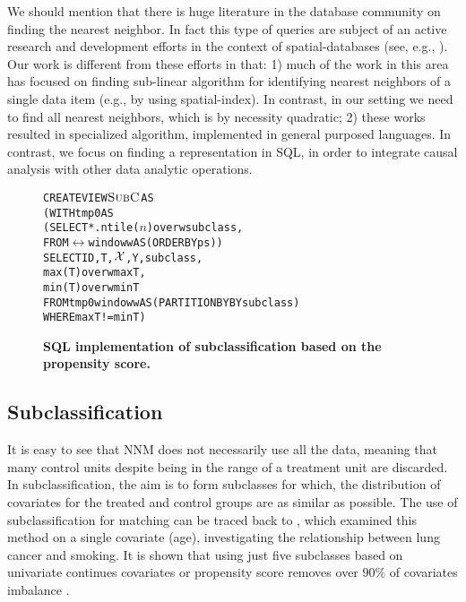 We should mention that there is huge literature in the database
community on finding the nearest neighbor. In fact this type of
queries are subject of an active research and development efforts in
the context of spatial-databases (see, e.g.,
\cite{obe2015postgis}). Our work is different from these efforts in that: 1) much of the work in this area has focused on finding sub-linear algorithm for identifying nearest neighbors of a single data item (e.g., by using spatial-index). In contrast, in our setting
we need to find all nearest neighbors, which is by necessity quadratic; 2) these works resulted in specialized algorithm,
implemented in general purposed languages. In contrast, we focus on finding a representation in SQL, in order to integrate causal
 analysis with other data analytic operations.  









\begin{figure}
\begin{alltt} 
CREATE VIEW \(\sbc\) AS
(WITH tmp0 AS
  (SELECT *. ntile(\(n\)) over w subclass,
   FROM \(\rel\) window w AS (ORDER BY ps))
SELECT ID, T, \(\ccv\), Y, subclass,
             max(T) over w maxT, 
             min(T) over w minT
FROM tmp0  window w AS (PARTITION BY BY subclass)
WHERE maxT!=minT)
\end{alltt}
\vspace{-0.3cm}
  \caption{\bf{SQL implementation of subclassification based on the
      propensity score.}}\label{fig:subpr}
\end{figure}

\vspace{-.2cm}

\subsection{Subclassification}
\label{sec:sub}
It is easy to see that NNM does not necessarily use all the data,
meaning that many control units despite being in the range of a
treatment unit are discarded.  In subclassification, the aim is to
form subclasses for which, the distribution of covariates for the
treated and control groups are as similar as possible. The use of
subclassification for matching can be traced back to
\cite{cochran1968effectiveness}, which examined this method on a
single covariate (age), investigating the relationship between lung
cancer and smoking. It is shown that using just five subclasses based
on univariate continues covariates or propensity score removes over
$90\%$ of covariates imbalance \cite{cochran1968effectiveness,rosenbaum1984reducing}.

